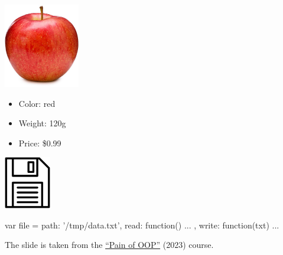\documentclass{article}
\begin{document}
\begin{multicols}{2}
\includegraphics[width=1.3in]{apple.jpg}
\begin{itemize}\setlength\itemsep{0em}
\item Color: red
\item Weight: 120g
\item Price: \$0.99
\end{itemize}
\par\columnbreak\par
\includegraphics[width=0.8in]{file-on-disc.jpg}
\par
{\small\begin{ffcode}
var file = {
  path: '/tmp/data.txt',
  read: function() { ... },
  write: function(txt) { ... }
}
\end{ffcode}
}
\end{multicols}
\par
{\scriptsize The slide is taken from the \href{https://github.com/yegor256/painofoop}{``Pain of OOP''} (2023) course.\par}
\plush{}


\end{document}
